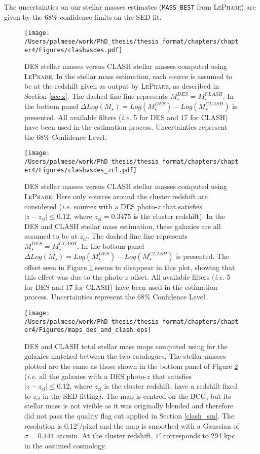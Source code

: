 {The uncertainties on our stellar masses estimates (\texttt{MASS\_BEST} from \textsc{LePhare}) are given by the 68\% confidence limits on the SED fit.
\begin{figure}\centering
\texttt{[image: /Users/palmese/work/PhD\_thesis/thesis\_format/chapters/chapter4/Figures/clashvsdes.pdf]}
\caption{DES stellar masses versus CLASH stellar masses computed using \textsc{LePhare}. In the stellar mass estimation, each source is  assumed to be at the redshift given as output by \textsc{LePhare}, as described in Section \ref{sec:z}. The dashed line line represents $M_\star^{DES}=M_\star^{CLASH}$. In the bottom panel $\Delta Log(M_\star)=Log(M_\star^{DES})-Log(M_\star^{CLASH})$ is presented. All available filters (\emph{i.e.} 5 for DES and 17 for CLASH) have been used in the estimation process. Uncertainties represent the 68\% Confidence Level.}\label{SMdesvsclash}
\end{figure}
\begin{figure}\centering
\texttt{[image: /Users/palmese/work/PhD\_thesis/thesis\_format/chapters/chapter4/Figures/clashvsdes\_zcl.pdf]}
\caption{DES stellar masses versus CLASH stellar masses computed using \textsc{LePhare}. Here only sources around the cluster redshift are considered (\emph{i.e.} sources with a DES photo-$z$ that satisfies $|z-z_{cl}| \le 0.12$, where $z_{cl}=0.3475$ is the cluster redshift). In the DES and CLASH stellar mass estimation, these galaxies are all assumed to be at $z_{cl}$. The dashed line line represents $M_\star^{DES}=M_\star^{CLASH}$. In the bottom panel $\Delta Log(M_\star)=Log(M_\star^{DES})-Log(M_\star^{CLASH})$ is presented. The offset seen in Figure \ref{SMdesvsclash} seems to disappear in this plot, showing that this effect was due to the photo-$z$ offset. All available filters (\emph{i.e.} 5 for DES and 17 for CLASH) have been used in the estimation process. Uncertainties represent the 68\% Confidence Level.}\label{SMdesvsclash_zcl}
\end{figure}
\begin{figure}\centering
\texttt{[image: /Users/palmese/work/PhD\_thesis/thesis\_format/chapters/chapter4/Figures/maps\_des\_and\_clash.eps]}\caption{DES and CLASH total stellar mass maps computed using \lephare for the galaxies matched between the two catalogues. The stellar masses plotted are the same as those shown in the bottom panel of Figure \protect\ref{SMdesvsclash_zcl} (\emph{i.e.} all the galaxies with a DES photo-$z$ that satisfies $|z-z_{cl}| \le 0.12$, where $z_{cl}$ is the cluster redshift, have a redshift fixed to $z_{cl}$ in the SED fitting). The map is centred on the BCG, but its stellar mass is not visible as it was originally blended and therefore did not pass the quality flag cut applied in Section \ref{clash_sm}. The resolution is $0.12'/$pixel and the map is smoothed with a Gaussian of $\sigma=0.144$ arcmin. At the cluster redshift, $1'$ corresponds to 294 kpc in the assumed cosmology.}\label{desclashmaps}
\end{figure}

}
